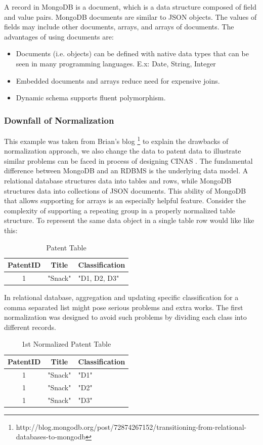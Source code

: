 \documentclass{sig-alternate}
\begin{document}
{A record in MongoDB is a document, which is a data structure composed of field and value pairs. MongoDB documents are similar to JSON objects. The values of fields may include other documents, arrays, and arrays of documents. The advantages of using documents are:
\begin{itemize}
\item Documents (i.e. objects) can be defined with native data types that can be seen in many programming languages. E.x: Date, String, Integer
\item Embedded documents and arrays reduce need for expensive joins.
\item Dynamic schema supports fluent polymorphism.
\end{itemize}

\subsubsection{Downfall of Normalization }
This example was taken from Brian's blog \footnote{http://blog.mongodb.org/post/72874267152/transitioning-from-relational-databases-to-mongodb} to explain the drawbacks of normalization approach, we also change the data to patent data to illustrate similar problems can be faced in process of designing CINAS . The fundamental difference between MongoDB and an RDBMS is the underlying data model. A relational database structures data into tables and rows, while MongoDB structures data into collections of JSON documents. This ability of MongoDB that allows supporting for arrays is an especially helpful feature. Consider the complexity of supporting a repeating group in a properly normalized table structure. To represent the same data object in a single table row would like like this:

\begin{table}[htb]
\begin{tabular}{|c|c|l|} \hline
PatentID&Title&Classification\\ \hline
1& "Snack"& "D1, D2, D3"\\ \hline
\end{tabular}
\centering
\caption{Patent Table}
\end{table}

In relational database, aggregation and updating specific classification for a comma separated list might pose serious problems and extra works. The first normalization was designed to avoid such problems by dividing each class into different records.

\begin{table}[htb]
\begin{tabular}{|c|c|l|} \hline
PatentID&Title&Classification\\ \hline
1& "Snack"& "D1"\\ \hline
1& "Snack"& "D2"\\ \hline
1& "Snack"& "D3"\\ \hline
\end{tabular}
\centering
\caption{1st Normalized Patent Table}
\end{table}

}
\end{document}
